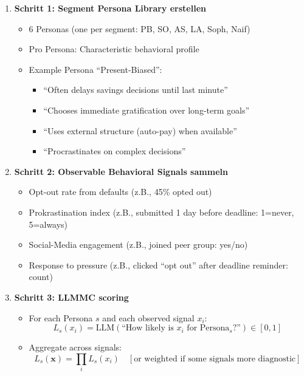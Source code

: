 \begin{enumerate}
\item \textbf{Schritt 1: Segment Persona Library erstellen}
  \begin{itemize}[nosep]
  \item 6 Personas (one per segment: PB, SO, AS, LA, Soph, Naif)
  \item Pro Persona: Characteristic behavioral profile
  \item Example Persona ``Present-Biased'':
    \begin{itemize}[nosep]
    \item ``Often delays savings decisions until last minute''
    \item ``Chooses immediate gratification over long-term goals''
    \item ``Uses external structure (auto-pay) when available''
    \item ``Procrastinates on complex decisions''
    \end{itemize}
  \end{itemize}

\item \textbf{Schritt 2: Observable Behavioral Signals sammeln}
  \begin{itemize}[nosep]
  \item Opt-out rate from defaults (z.B., 45\% opted out)
  \item Prokrastination index (z.B., submitted 1 day before deadline: 1=never, 5=always)
  \item Social-Media engagement (z.B., joined peer group: yes/no)
  \item Response to pressure (z.B., clicked ``opt out'' after deadline reminder: count)
  \end{itemize}

\item \textbf{Schritt 3: LLMMC scoring}
  \begin{itemize}[nosep]
  \item For each Persona $s$ and each observed signal $x_i$:
    \begin{equation}
    L_s(x_i) = \text{LLM}(\text{``How likely is } x_i \text{ for Persona}_s\text{?''}) \in [0,1]
    \label{eq:19-llmmc-likelihood}
    \end{equation}
  \item Aggregate across signals:
    \begin{equation}
    L_s(\mathbf{x}) = \prod_i L_s(x_i) \quad [\text{or weighted if some signals more diagnostic}]
    \label{eq:19-llmmc-aggregate}
    \end{equation}
  \end{itemize}


\end{enumerate}
